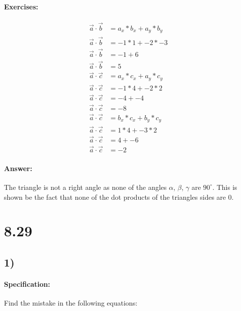 \documentclass{article}
\begin{document}
\paragraph{Exercises:}
\begin{align}
    \vec{a} \cdot \vec{b} &= a_x * b_x + a_y * b_y \\
    \vec{a} \cdot \vec{b} &= -1 * 1 + -2 * -3 \\
    \vec{a} \cdot \vec{b} &= -1 + 6 \\
    \vec{a} \cdot \vec{b} &= 5 \\[20pt]
    \vec{a} \cdot \vec{c} &= a_x * c_x + a_y * c_y \\
    \vec{a} \cdot \vec{c} &= -1 * 4 + -2 * 2 \\
    \vec{a} \cdot \vec{c} &= -4 + -4 \\
    \vec{a} \cdot \vec{c} &= -8 \\[20pt]
    \vec{a} \cdot \vec{c} &= b_x * c_x + b_y * c_y \\
    \vec{a} \cdot \vec{c} &= 1 * 4 + -3 * 2 \\
    \vec{a} \cdot \vec{c} &= 4 + -6 \\
    \vec{a} \cdot \vec{c} &= -2
\end{align}

\paragraph{Answer:}
The triangle is not a right angle as none of the angles $\alpha$, $\beta$, $\gamma$ are $90^\circ$.
This is shown be the fact that none of the dot products of the triangles sides are 0.

\pagebreak

\section*{8.29}
\subsection*{1)}
\paragraph{Specification:}
Find the mistake in the following equations:
\def\AB{\begin{pmatrix}
    15 \\
    8 \\
\end{pmatrix}}
\end{document}
